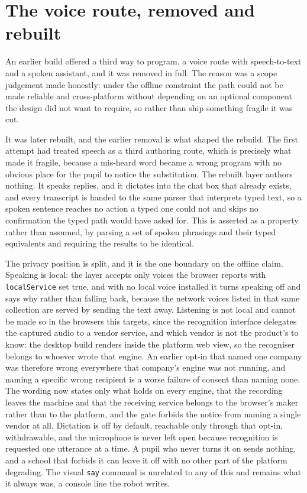 \documentclass[11pt,a4paper]{report}
\begin{document}
\section{The voice route, removed and rebuilt}
\label{sec:voice}
An earlier build offered a third way to program, a voice route with speech-to-text and a spoken assistant, and it was removed in full. The reason was a scope judgement made honestly: under the offline constraint the path could not be made reliable and cross-platform without depending on an optional component the design did not want to require, so rather than ship something fragile it was cut.

It was later rebuilt, and the earlier removal is what shaped the rebuild. The first attempt had treated speech as a third authoring route, which is precisely what made it fragile, because a mis-heard word became a wrong program with no obvious place for the pupil to notice the substitution. The rebuilt layer authors nothing. It speaks replies, and it dictates into the chat box that already exists, and every transcript is handed to the same parser that interprets typed text, so a spoken sentence reaches no action a typed one could not and skips no confirmation the typed path would have asked for. This is asserted as a property rather than assumed, by parsing a set of spoken phrasings and their typed equivalents and requiring the results to be identical.

The privacy position is split, and it is the one boundary on the offline claim. Speaking is local: the layer accepts only voices the browser reports with \texttt{localService} set true, and with no local voice installed it turns speaking off and says why rather than falling back, because the network voices listed in that same collection are served by sending the text away. Listening is not local and cannot be made so in the browsers this targets, since the recognition interface delegates the captured audio to a vendor service, and which vendor is not the product's to know: the desktop build renders inside the platform web view, so the recogniser belongs to whoever wrote that engine. An earlier opt-in that named one company was therefore wrong everywhere that company's engine was not running, and naming a specific wrong recipient is a worse failure of consent than naming none. The wording now states only what holds on every engine, that the recording leaves the machine and that the receiving service belongs to the browser's maker rather than to the platform, and the gate forbids the notice from naming a single vendor at all. Dictation is off by default, reachable only through that opt-in, withdrawable, and the microphone is never left open because recognition is requested one utterance at a time. A pupil who never turns it on sends nothing, and a school that forbids it can leave it off with no other part of the platform degrading. The visual \texttt{say} command is unrelated to any of this and remains what it always was, a console line the robot writes.
\end{document}
